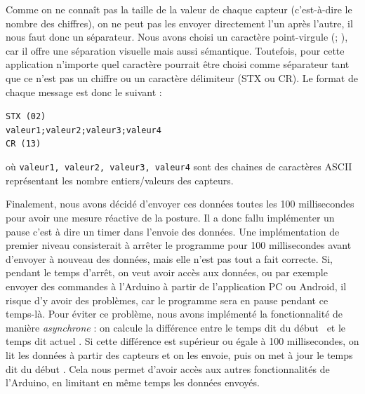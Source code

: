 \documentclass{polytech/polytech}
\begin{document}
Comme on ne connaît pas la taille de la valeur de chaque capteur (c'est-à-dire le nombre des chiffres), on ne peut pas les envoyer directement l'un après l'autre, il nous faut donc un séparateur.
Nous avons choisi un caractère point-virgule (\guillemotleft ; \guillemotright), car il offre une séparation visuelle mais aussi sémantique. Toutefois, pour cette application n'importe quel caractère pourrait être choisi comme séparateur tant que ce n'est pas un chiffre ou un caractère délimiteur (STX ou CR). Le format de chaque message est donc le suivant :

\begin{center}
\texttt{STX (02)}\\
\texttt{valeur1;valeur2;valeur3;valeur4}\\
\texttt{CR (13)}
\end{center}

où \texttt{valeur1, valeur2, valeur3, valeur4} sont des chaines de caractères ASCII représentant les nombre entiers/valeurs des capteurs. 

Finalement, nous avons décidé d'envoyer ces données toutes les 100 millisecondes pour avoir une mesure réactive de la posture. Il a donc fallu implémenter un pause c'est à dire un \guillemotleft timer \guillemotright  dans l'envoie des données.
 Une implémentation de premier niveau consisterait à arrêter le programme pour 100 millisecondes avant d'envoyer à nouveau des données, mais elle n'est pas tout a fait correcte.
  Si, pendant le temps d'arrêt, on veut avoir accès aux données, ou par exemple envoyer des commandes à l'Arduino à partir de l'application PC ou Android, il risque d'y avoir des problèmes, car le programme sera en pause pendant ce temps-là.
   Pour éviter ce problème, nous avons implémenté la fonctionnalité de manière \textit{asynchrone} : on calcule la différence entre le temps dit \guillemotleft du début \guillemotright\ et le temps dit \guillemotleft actuel \guillemotright . 
   Si cette différence est supérieur ou égale à 100 millisecondes, on lit les données à partir des capteurs et on les envoie, puis on met à jour le temps dit \guillemotleft du début \guillemotright . 
   Cela nous permet d'avoir accès aux autres fonctionnalités de l'Arduino, en limitant en même temps les données envoyés.
\end{document}
